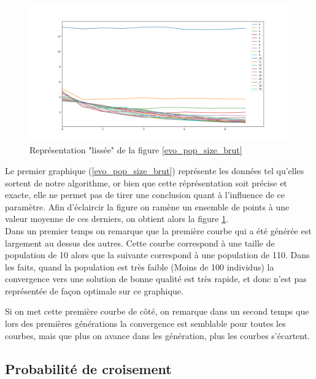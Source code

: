 \documentclass[12pt]{report}
\begin{document}
        \begin{figure}[!]
          \centering
          \includegraphics[width=18cm]{img/evo_pop_size_moy.png}
          \caption{Représentation "lissée" de la figure \ref{evo_pop_size_brut}}
          \label{evo_pop_size_moy}
        \end{figure}

        Le premier graphique (\ref{evo_pop_size_brut}) représente les données tel qu'elles sortent de notre algorithme, or bien que cette réprésentation soit précise et exacte, elle ne permet pas de tirer une conclusion quant à l'influence de ce paramètre. Afin d'éclaircir la figure on ramène un ensemble de points à une valeur moyenne de ces derniers, on obtient alors la figure \ref{evo_pop_size_moy}. \\

        Dans un premier temps on remarque que la première courbe qui a été générée est largement au dessus des autres. Cette courbe correspond à une taille de population de 10 alors que la suivante correspond à une population de 110. Dans les faits, quand la population est très faible (Moins de 100 individus) la convergence vers une solution de bonne qualité est très rapide, et donc n'est pas représentée de façon optimale sur ce graphique.

        Si on met cette première courbe de côté, on remarque dans un second temps que lors des premières générations la convergence est semblable pour toutes les courbes, mais que plus on avance dans les génération, plus les courbes s'écartent.



      \subsection{Probabilité de croisement}
\end{document}
